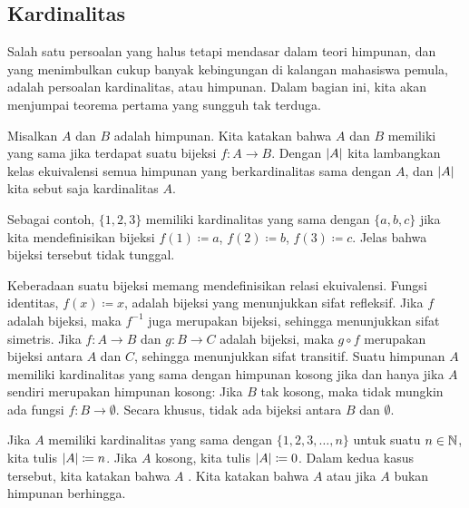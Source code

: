 \subsection{Kardinalitas}

Salah satu persoalan yang halus tetapi mendasar dalam teori himpunan,
dan yang menimbulkan cukup banyak kebingungan di kalangan mahasiswa pemula,
adalah persoalan kardinalitas, atau  himpunan.
Dalam bagian ini, kita akan menjumpai teorema pertama yang sungguh
tak terduga.

\begin{defn}
Misalkan $A$ dan $B$ adalah himpunan.  Kita katakan bahwa $A$ dan $B$ memiliki
\emph{} yang sama
jika terdapat suatu bijeksi $f \colon A \to B$.  Dengan
$\lvert {A} \rvert$  kita lambangkan kelas ekuivalensi semua himpunan yang berkardinalitas sama dengan
$A$, dan $\lvert {A} \rvert$ kita sebut saja kardinalitas $A$.
\end{defn}

Sebagai contoh, $\{ 1,2,3 \}$ memiliki kardinalitas yang sama dengan $\{ a,b,c \}$ jika
kita mendefinisikan bijeksi $f(1) \coloneqq a$, $f(2) \coloneqq b$, $f(3) \coloneqq c$.
Jelas bahwa bijeksi tersebut tidak tunggal.

Keberadaan suatu bijeksi memang mendefinisikan relasi ekuivalensi.
Fungsi identitas, $f(x) \coloneqq x$, adalah bijeksi yang menunjukkan sifat refleksif.
Jika $f$ adalah bijeksi, maka $f^{-1}$ juga merupakan bijeksi, sehingga menunjukkan sifat simetris.
Jika $f \colon A \to B$ dan $g \colon B \to C$ adalah bijeksi, maka
$g \circ f$ merupakan bijeksi antara $A$ dan $C$, sehingga menunjukkan sifat transitif.
Suatu himpunan $A$ memiliki kardinalitas yang sama dengan himpunan kosong jika dan hanya
jika $A$ sendiri merupakan himpunan kosong: Jika $B$ tak kosong, maka
tidak mungkin ada fungsi $f \colon B \to \emptyset$.
Secara khusus, tidak ada bijeksi antara $B$ dan $\emptyset$.

\begin{defn}
Jika $A$ memiliki kardinalitas yang sama dengan $\{ 1,2,3,\ldots,n \}$
untuk suatu $n \in {\mathbb{N}}$,
kita tulis $\lvert {A} \rvert \coloneqq n$.  Jika $A$ kosong, kita tulis
$\lvert {A} \rvert \coloneqq 0$.
Dalam kedua kasus tersebut, kita katakan bahwa $A$
\emph{}.
Kita katakan bahwa $A$ \emph{} atau 
jika $A$ bukan himpunan berhingga.
\end{defn}

